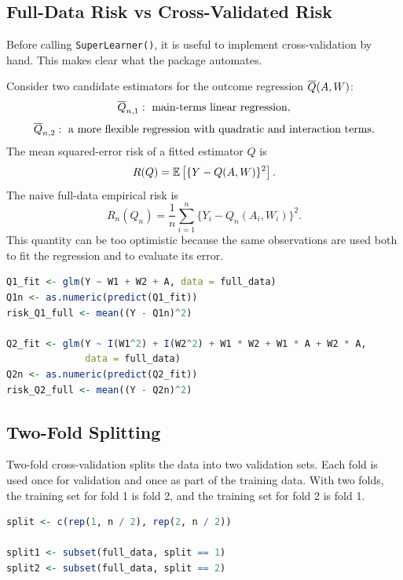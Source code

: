 \label{lec:6-2}

\subsection{Full-Data Risk vs Cross-Validated Risk}

Before calling \texttt{SuperLearner()}, it is useful to implement cross-validation by
hand. This makes clear what the package automates.

Consider two candidate estimators for the outcome regression $\overline{Q}(A,W)$:
\[
\overline{Q}_{n,1}: \text{ main-terms linear regression},
\]
\[
\overline{Q}_{n,2}: \text{ a more flexible regression with quadratic and interaction terms}.
\]
The mean squared-error risk of a fitted estimator $Q$ is
\[
R(Q)=\mathbb{E}\left[\{Y-Q(A,W)\}^2\right].
\]
The naive full-data empirical risk is
\[
R_n(Q_n)=\frac{1}{n}\sum_{i=1}^n\{Y_i-Q_n(A_i,W_i)\}^2.
\]
This quantity can be too optimistic because the same observations are used both to fit
the regression and to evaluate its error.

\begin{implementationbox}
\begin{lstlisting}[language=R]
Q1_fit <- glm(Y ~ W1 + W2 + A, data = full_data)
Q1n <- as.numeric(predict(Q1_fit))
risk_Q1_full <- mean((Y - Q1n)^2)

Q2_fit <- glm(Y ~ I(W1^2) + I(W2^2) + W1 * W2 + W1 * A + W2 * A,
              data = full_data)
Q2n <- as.numeric(predict(Q2_fit))
risk_Q2_full <- mean((Y - Q2n)^2)
\end{lstlisting}
\end{implementationbox}

\subsection{Two-Fold Splitting}

Two-fold cross-validation splits the data into two validation sets. Each fold is used
once for validation and once as part of the training data. With two folds, the training
set for fold 1 is fold 2, and the training set for fold 2 is fold 1.

\begin{implementationbox}
\begin{lstlisting}[language=R]
split <- c(rep(1, n / 2), rep(2, n / 2))

split1 <- subset(full_data, split == 1)
split2 <- subset(full_data, split == 2)
\end{lstlisting}
\end{implementationbox}

